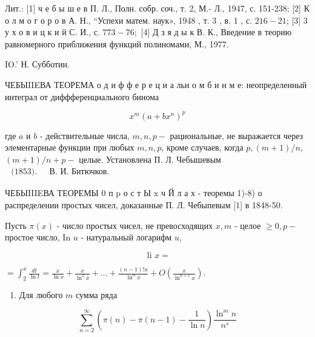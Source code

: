 \documentclass[10pt]{article}
\begin{document}
Лит.: [1] ч е б ы ш е в П. Л., Полн. собр. соч., т. 2, М.- Л., 1947, с. 151-238; [2] К о л м о г о р о в А. Н., “Успехи матем. наук», 1948 , т. 3 , в. 1 , с. $216-21$; [3] 3 у х о в и ц к и й С. И., с. $773-76 ;$ [4] Д з я д ы к В. К., Введение в теорию равномерного приближения функций полиномами, М., 1977.



IO.' Н. Субботин.



ЧЕБЫIIEВА ТЕОРЕМА о д и ф ф е р е ц и а льн о м б и н м е: неопределенный интеграл от диффференциального бинома



\[

x^{m}\left(a+b x^{n}\right)^{p}

\]



где $a$ и $b$ - действительные числа, $m, n, p-$ рациональные, не выражается через элементарные функции при любых $m, n, p$, кроме случаев, когда $p,(m+1) / n$, $(m+1) / n+p-$ целые. Установлена П. Л. Чебышевым $\begin{array}{ll}\text { (1853). } & \text { В. И. Битючков. }\end{array}$



ЧЕБЫIIIEВА ТЕОРЕМЫ 0 п $\mathrm{p}$ о с т Ы $\mathrm{x}$ ч Й л а х - теоремы 1)-8) о распределении простых чисел, доказанные П. Л. Чебыпевым [1] в 1848-50.



Пусть $\pi(x)$ - число простых чисел, не превосходящих $x, m$ - целое $\geqslant 0, p-$ простое число, In $u$ - натуральный логарифм $u$,



\[

\text { li } x=

\]



$=\int_{2}^{x} \frac{d t}{\ln t}=\frac{x}{\ln x}+\frac{x}{\ln ^{2} x}+\ldots+\frac{(n-1) ! x}{\ln ^{n} x}+O\left(\frac{x}{\ln ^{n+1} x}\right)$.



\begin{enumerate}

  \item Для любого $m$ сумма ряда

\end{enumerate}



\[

\sum_{n=2}^{\infty}\left(\pi(n)-\pi(n-1)-\frac{1}{\ln n}\right) \frac{\ln ^{m} n}{n^{s}}

\]
\end{document}
